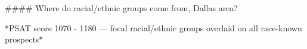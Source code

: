 #### Where do racial/ethnic groups come from, Dallas area?

*PSAT score 1070 - 1180 — focal racial/ethnic groups overlaid on all race-known prospects*
